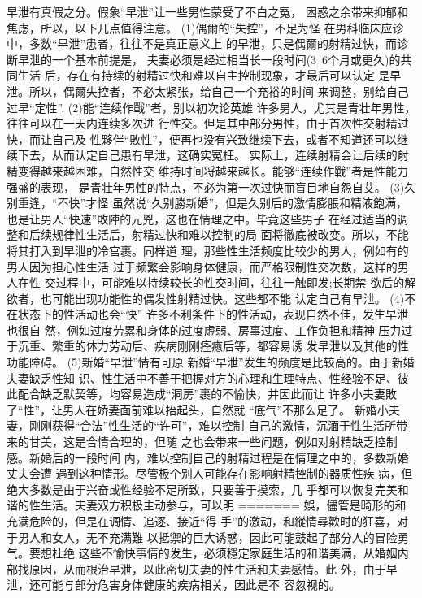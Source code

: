 \documentclass[12pt,UTF8]{ctexbook}
\begin{document}
早泄有真假之分。假象“早泄”让一些男性蒙受了不白之冤，
困惑之余带来抑郁和焦虑，所以，以下几点值得注意。
(1)偶爾的“失控”，不足为怪
在男科临床应诊中，多数“早泄”患者，往往不是真正意义上
的早泄，只是偶爾的射精过快，而诊断早泄的一个基本前提是，
夫妻必须是经过相当长一段时间(3~6个月或更久)的共同生活
后，存在有持续的射精过快和难以自主控制现象，才最后可以认定
是早泄。所以，偶爾失控者，不必太紧张，给自己一个充裕的时间
来调整，别给自己过早“定性”.
(2)能“连续作戰”者，别以初次论英雄
许多男人，尤其是青壮年男性，往往可以在一天内连续多次进
行性交。但是其中部分男性，由于首次性交射精过快，而让自己及
性夥伴“敗性”，便再也没有兴致继续下去，或者不知道还可以继
续下去，从而认定自己患有早泄，这确实冤枉。
实际上，连续射精会让后续的射精变得越来越困难，自然性交
维持时间将越来越长。能够“连续作戰”者是性能力强盛的表现，
是青壮年男性的特点，不必为第一次过快而盲目地自怨自艾。
(3)久别重逢，“不快”才怪
虽然说“久别勝新婚”，但是久别后的激情膨脹和精液飽满，
也是让男人“快速”敗陣的元兇，这也在情理之中。毕竟这些男子
在经过适当的调整和后续规律性生活后，射精过快和难以控制的局
面将徹底被改变。所以，不能将其打入到早泄的冷宫裹。同样道
理，那些性生活频度比较少的男人，例如有的男人因为担心性生活
过于频繁会影响身体健康，而严格限制性交次数，这样的男人在性
交过程中，可能难以持续较长的性交时间，往往一触即发;长期禁
欲后的解欲者，也可能出现功能性的偶发性射精过快。这些都不能
认定自己有早泄。
(4)不在状态下的性活动也会“快”
许多不利条件下的性活动，表现自然不佳，发生早泄也很自
然，例如过度劳累和身体的过度虚弱、房事过度、工作负担和精神
压力过于沉重、繁重的体力劳动后、疾病刚刚痊癒后等，都容易诱
发早泄以及其他的性功能障碍。
(5)新婚“早泄”情有可原
新婚“早泄”发生的频度是比较高的。由于新婚夫妻缺乏性知
识、性生活中不善于把握对方的心理和生理特点、性经验不足、彼
此配合缺乏默契等，均容易造成“洞房”裹的不愉快，并因此而让
许多小夫妻敗了“性”，让男人在娇妻面前难以抬起头，自然就
“底气”不那么足了。
新婚小夫妻，刚刚获得“合法”性生活的“许可”，难以控制
自己的激情，沉湎于性生活所带来的甘美，这是合情合理的，但随
之也会带来一些问题，例如对射精缺乏控制感。新婚后的一段时间
内，难以控制自己的射精过程是在情理之中的，多数新婚丈夫会遭
遇到这种情形。尽管极个别人可能存在影响射精控制的器质性疾
病，但绝大多数是由于兴奋或性经验不足所致，只要善于摸索，几
乎都可以恢复完美和谐的性生活。夫妻双方积极主动参与，可以明
=======
娛，儘管是畸形的和充满危险的，但是在调情、追逐、接近“得
手”的激动，和縱情尋歡时的狂喜，对于男人和女人，无不充满難
以抵禦的巨大诱惑，因此可能鼓起了部分人的冒险勇气。要想杜绝
这些不愉快事情的发生，必须穩定家庭生活的和谐美满，从婚姻内
部找原因，从而根治早泄，以此密切夫妻的性生活和夫妻感情。此
外，由于早泄，还可能与部分危害身体健康的疾病相关，因此是不
容忽视的。
\end{document}
